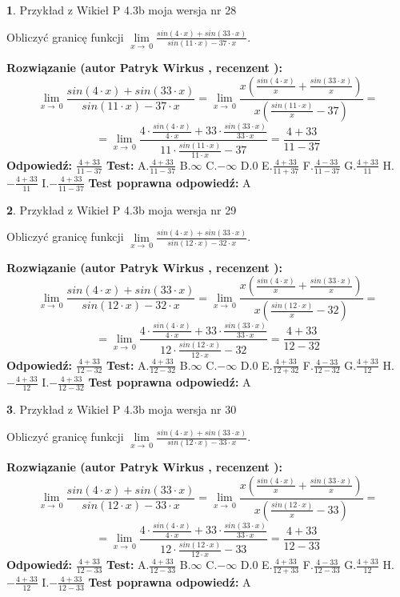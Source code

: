 \documentclass[12pt, a4paper]{article}
\theoremstyle{definition} %
\newtheorem{zad}{}
\newcommand{\zadStart}[1]{\begin{zad}#1\newline}
\newcommand{\zadStop}{\end{zad}}
\newcommand{\rozwStart}[2]{\noindent \textbf{Rozwiązanie (autor #1 , recenzent #2): }\newline}
\newcommand{\rozwStop}{\newline}
\newcommand{\odpStart}{\noindent \textbf{Odpowiedź:}\newline}
\newcommand{\odpStop}{\newline}
\newcommand{\testStart}{\noindent \textbf{Test:}\newline}
\newcommand{\testStop}{\newline}
\newcommand{\kluczStart}{\noindent \textbf{Test poprawna odpowiedź:}\newline}
\newcommand{\kluczStop}{\newline}
\begin{document}
\zadStart{Przykład z Wikieł P 4.3b moja wersja nr 28}


Obliczyć granicę funkcji $\lim\limits_{x\to\ 0}\frac{sin(4 \cdot x)+sin(33 \cdot x)}{sin(11 \cdot x)-37 \cdot x}$.
\zadStop
\rozwStart{Patryk Wirkus}{}
$$\lim\limits_{x\to\ 0}\frac{sin(4 \cdot x)+sin(33 \cdot x)}{sin(11 \cdot x)-37 \cdot x}=\lim\limits_{x\to\ 0}\frac{x(\frac{sin(4 \cdot x)}{x}+\frac{sin(33 \cdot x)}{x})}{x(\frac{sin(11 \cdot x)}{x}-37)}=$$
$$=\lim\limits_{x\to\ 0}\frac{4 \cdot \frac{sin(4 \cdot x)}{4 \cdot x}+33 \cdot \frac{sin(33 \cdot x)}{33 \cdot x}}{11 \cdot \frac{sin(11 \cdot x)}{11 \cdot x}-37}=\frac{4+33}{11-37}$$
\rozwStop
\odpStart
$\frac{4+33}{11-37}$
\odpStop
\testStart
A.$\frac{4+33}{11-37}$
B.$\infty$
C.$-\infty$
D.$0$
E.$\frac{4+33}{11+37}$
F.$\frac{4-33}{11-37}$
G.$\frac{4+33}{11}$
H.$-\frac{4+33}{11}$
I.$-\frac{4+33}{11-37}$
\testStop
\kluczStart
A
\kluczStop



\zadStart{Przykład z Wikieł P 4.3b moja wersja nr 29}


Obliczyć granicę funkcji $\lim\limits_{x\to\ 0}\frac{sin(4 \cdot x)+sin(33 \cdot x)}{sin(12 \cdot x)-32 \cdot x}$.
\zadStop
\rozwStart{Patryk Wirkus}{}
$$\lim\limits_{x\to\ 0}\frac{sin(4 \cdot x)+sin(33 \cdot x)}{sin(12 \cdot x)-32 \cdot x}=\lim\limits_{x\to\ 0}\frac{x(\frac{sin(4 \cdot x)}{x}+\frac{sin(33 \cdot x)}{x})}{x(\frac{sin(12 \cdot x)}{x}-32)}=$$
$$=\lim\limits_{x\to\ 0}\frac{4 \cdot \frac{sin(4 \cdot x)}{4 \cdot x}+33 \cdot \frac{sin(33 \cdot x)}{33 \cdot x}}{12 \cdot \frac{sin(12 \cdot x)}{12 \cdot x}-32}=\frac{4+33}{12-32}$$
\rozwStop
\odpStart
$\frac{4+33}{12-32}$
\odpStop
\testStart
A.$\frac{4+33}{12-32}$
B.$\infty$
C.$-\infty$
D.$0$
E.$\frac{4+33}{12+32}$
F.$\frac{4-33}{12-32}$
G.$\frac{4+33}{12}$
H.$-\frac{4+33}{12}$
I.$-\frac{4+33}{12-32}$
\testStop
\kluczStart
A
\kluczStop



\zadStart{Przykład z Wikieł P 4.3b moja wersja nr 30}


Obliczyć granicę funkcji $\lim\limits_{x\to\ 0}\frac{sin(4 \cdot x)+sin(33 \cdot x)}{sin(12 \cdot x)-33 \cdot x}$.
\zadStop
\rozwStart{Patryk Wirkus}{}
$$\lim\limits_{x\to\ 0}\frac{sin(4 \cdot x)+sin(33 \cdot x)}{sin(12 \cdot x)-33 \cdot x}=\lim\limits_{x\to\ 0}\frac{x(\frac{sin(4 \cdot x)}{x}+\frac{sin(33 \cdot x)}{x})}{x(\frac{sin(12 \cdot x)}{x}-33)}=$$
$$=\lim\limits_{x\to\ 0}\frac{4 \cdot \frac{sin(4 \cdot x)}{4 \cdot x}+33 \cdot \frac{sin(33 \cdot x)}{33 \cdot x}}{12 \cdot \frac{sin(12 \cdot x)}{12 \cdot x}-33}=\frac{4+33}{12-33}$$
\rozwStop
\odpStart
$\frac{4+33}{12-33}$
\odpStop
\testStart
A.$\frac{4+33}{12-33}$
B.$\infty$
C.$-\infty$
D.$0$
E.$\frac{4+33}{12+33}$
F.$\frac{4-33}{12-33}$
G.$\frac{4+33}{12}$
H.$-\frac{4+33}{12}$
I.$-\frac{4+33}{12-33}$
\testStop
\kluczStart
A
\kluczStop
\end{document}
